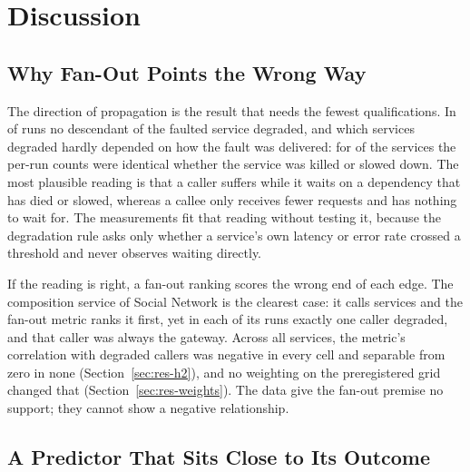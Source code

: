 \section{Discussion}
\label{sec:discussion}

\subsection{Why Fan-Out Points the Wrong Way}

The direction of propagation is the result that needs the fewest qualifications. In
 of  runs no descendant of the
faulted service degraded, and which services degraded hardly depended on how the fault was
delivered: for  of the
 services the per-run counts were identical whether the
service was killed or slowed down. The most plausible reading is that a caller suffers while it
waits on a dependency that has died or slowed, whereas a callee only receives fewer requests and
has nothing to wait for. The measurements fit that reading without testing it, because the
degradation rule asks only whether a service's own latency or error rate crossed a threshold and
never observes waiting directly.

If the reading is right, a fan-out ranking scores the wrong end of each edge. The composition
service of Social Network is the clearest case: it calls  services
and the fan-out metric ranks it first, yet in each of its  runs
exactly one caller degraded, and that caller was always the gateway.
Across all services, the metric's correlation with degraded callers was negative in every cell
and separable from zero in none (Section~\ref{sec:res-h2}), and no weighting on the
preregistered grid changed that (Section~\ref{sec:res-weights}). The data give the fan-out
premise no support; they cannot show a negative relationship.

\subsection{A Predictor That Sits Close to Its Outcome}

